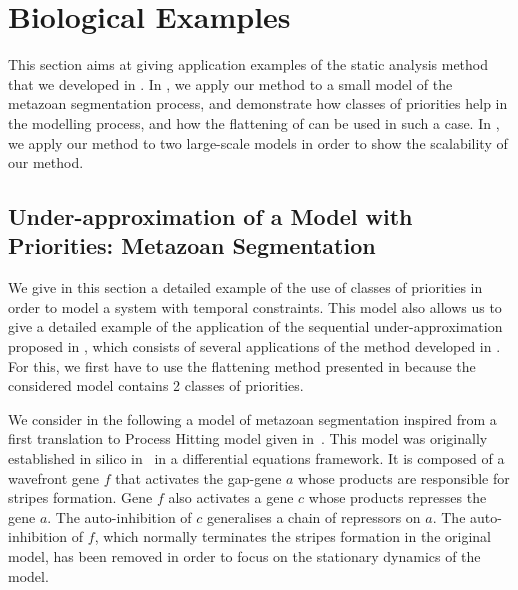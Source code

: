 
\section{Biological Examples}\label{sec:example}

This section aims at giving application examples of the static analysis method
that we developed in .
In , we apply our method to a small model of the
metazoan segmentation process,
and demonstrate how classes of priorities help in the modelling process,
and how the flattening of 
can be used in such a case.
In , we apply our method to two large-scale models
in order to show the scalability of our method.



\subsection{Under-approximation of a Model with Priorities: Metazoan Segmentation}
\label{ssec:ex-metazoan}

We give in this section a detailed example of the use of classes of priorities
in order to model a system with temporal constraints.
This model also allows us to give a detailed example of the application of the sequential
under-approximation proposed in ,
which consists of several applications of the method developed in
.
For this, we first have to use the flattening method presented in 
because the considered model contains 2 classes of priorities.

We consider in the following a model of metazoan segmentation
inspired from a first translation to Process Hitting model given in~\cite{PMR10-TCSB}.
This model was originally established in silico in~\cite{MSB:MSB4100192}
in a differential equations framework.
It is composed of a wavefront gene $f$ that activates the gap-gene $a$ whose products are responsible for stripes formation.
Gene $f$ also activates a gene $c$ whose products represses the gene $a$.
The auto-inhibition of $c$ generalises a chain of repressors on $a$.
The auto-inhibition of $f$, which normally terminates
the stripes formation in the original model,
has been removed in order to focus on the stationary dynamics of the model.

